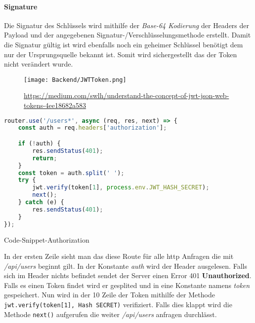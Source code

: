 \paragraph{Signature}
Die Signatur des Schlüssels wird mithilfe der \textit{Base-64 Kodierung} der Headers
der Payload und der angegebenen Signatur-/Verschlüsselungsmethode erstellt. Damit die Signatur
gültig ist wird ebenfalls noch ein geheimer Schlüssel benötigt dem nur der Ursprungsquelle bekannt
ist. Somit wird sichergestellt das der Token nicht verändert wurde.

\begin{figure}[H]
    \begin{center}
        \texttt{[image: Backend/JWTToken.png]}
    \end{center}
    \url{https://medium.com/swlh/understand-the-concept-of-jwt-json-web-tokens-4ee18682a583}
\end{figure}

\pagebreak


\begin{code}[htp]
    \begin{lstlisting}[firstnumber=1,language=JavaScript, style=CMD]
    router.use('/users*', async (req, res, next) => {
    const auth = req.headers['authorization'];

    if (!auth) {
        res.sendStatus(401);
        return;
    }
    const token = auth.split(' ');
    try {
        jwt.verify(token[1], process.env.JWT_HASH_SECRET);
        next();
    } catch (e) {
        res.sendStatus(401);
    }
});
    \end{lstlisting}
    \caption{Code-Snippet-Authorization}
\end{code}

In der ersten Zeile sieht man das diese Route für alle http Anfragen
die mit \textit{/api/users} beginnt gilt. In der Konstante \textit{auth}
wird der Header ausgelesen. Falls sich im Header nichts befindet sendet der
Server einen Error 401 \textbf{Unauthorized}. Falls es einen Token findet
wird er gesplited und in eine Konstante namens \textit{token} gespeichert.
Nun wird in der 10 Zeile der Token mithilfe der Methode \texttt{jwt.verify(token[1], Hash SECRET)}
verifiziert. Falls dies klappt wird die Methode \texttt{next()} aufgerufen die
weiter \textit{/api/users} anfragen durchlässt.


\cite{JWT}


